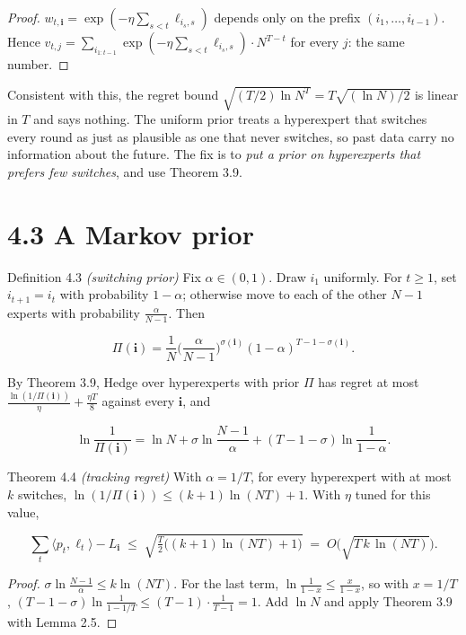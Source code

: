 \documentclass[11pt,a4paper,openany]{book}
\newcommand{\ip}[2]{\langle #1,#2\rangle}
\begin{document}
\begin{proof}
$w_{t,\mathbf i}=\exp(-\eta\sum_{s<t}\ell_{i_s,s})$ depends only on the prefix $(i_1,\dots,i_{t-1})$. Hence $v_{t,j}=\sum_{i_{1:t-1}}\exp(-\eta\sum_{s<t}\ell_{i_s,s})\cdot N^{T-t}$ for every $j$: the same number.
\end{proof}

Consistent with this, the regret bound $\sqrt{(T/2)\ln N^T}=T\sqrt{(\ln N)/2}$ is linear in $T$ and says nothing. The uniform prior treats a hyperexpert that switches every round as just as plausible as one that never switches, so past data carry no information about the future. The fix is to \emph{put a prior on hyperexperts that prefers few switches}, and use Theorem 3.9.

\section*{4.3 A Markov prior}\label{ch4-prior}

\begin{bdef}{Definition 4.3 \emph{(switching prior)}}
Fix $\alpha\in(0,1)$. Draw $i_1$ uniformly. For $t\ge1$, set $i_{t+1}=i_t$ with probability $1-\alpha$; otherwise move to each of the other $N-1$ experts with probability $\frac{\alpha}{N-1}$. Then

\[\Pi(\mathbf i)=\frac1N\Big(\frac{\alpha}{N-1}\Big)^{\sigma(\mathbf i)}(1-\alpha)^{T-1-\sigma(\mathbf i)}.\]

\end{bdef}

By Theorem 3.9, Hedge over hyperexperts with prior $\Pi$ has regret at most $\frac{\ln(1/\Pi(\mathbf i))}{\eta}+\frac{\eta T}{8}$ against every $\mathbf i$, and

\[\ln\frac1{\Pi(\mathbf i)}=\ln N+\sigma\ln\frac{N-1}{\alpha}+(T-1-\sigma)\ln\frac1{1-\alpha}.\]

\begin{bthm}{Theorem 4.4 \emph{(tracking regret)}}
With $\alpha=1/T$, for every hyperexpert with at most $k$ switches, $\ln(1/\Pi(\mathbf i))\le(k+1)\ln(NT)+1$. With $\eta$ tuned for this value,

\[\sum_t\ip{p_t}{\ell_t}-L_{\mathbf i}\;\le\;\sqrt{\tfrac T2\big((k+1)\ln(NT)+1\big)}\;=\;O\big(\sqrt{T\,k\,\ln(NT)}\big).\]

\end{bthm}

\begin{proof}
$\sigma\ln\frac{N-1}{\alpha}\le k\ln(NT)$. For the last term, $\ln\frac1{1-x}\le\frac{x}{1-x}$, so with $x=1/T$, $(T-1-\sigma)\ln\frac{1}{1-1/T}\le(T-1)\cdot\frac1{T-1}=1$. Add $\ln N$ and apply Theorem 3.9 with Lemma 2.5.
\end{proof}
\end{document}
